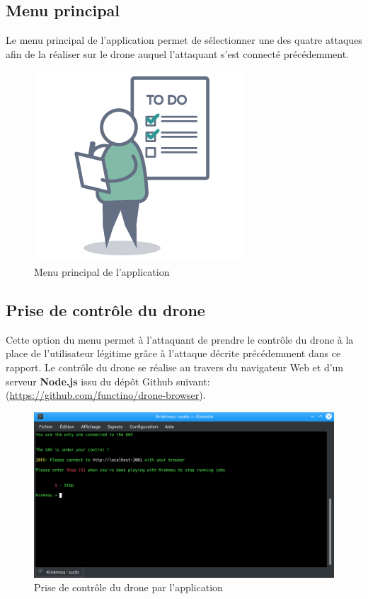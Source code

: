 \subsection{Menu principal}
Le menu principal de l'application permet de sélectionner une des quatre attaques afin de la réaliser sur le drone auquel l'attaquant s'est connecté précédemment.

\begin{figure}[H]
  \centering
  \includegraphics[scale=0.35]{images/todo}
  \caption{Menu principal de l'application}
\end{figure}

\subsection{Prise de contrôle du drone}
Cette option du menu permet à l'attaquant de prendre le contrôle du drone à la place de l'utilisateur légitime grâce à l'attaque décrite précédemment dans ce rapport. Le contrôle du drone se réalise au travers du navigateur Web et d'un serveur \textbf{Node.js} issu du dépôt Github suivant: (\url{https://github.com/functino/drone-browser}).\cite{ref5}

\begin{figure}[H]
  \centering
  \includegraphics[scale=0.35]{images/taking_control.png}
  \caption{Prise de contrôle du drone par l'application}
\end{figure}

